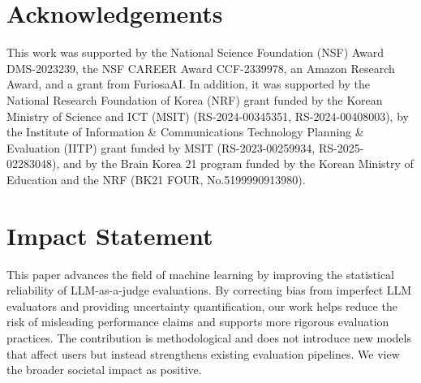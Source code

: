 \documentclass{article}
\theoremstyle{plain}
\theoremstyle{definition}
\theoremstyle{remark}
\begin{document}
\printAffiliationsAndNotice{}  %










\clearpage

\section*{Acknowledgements}

This work was supported by the National Science Foundation (NSF) Award DMS-2023239, the NSF CAREER Award CCF-2339978, an Amazon Research Award, and a grant from FuriosaAI.
In addition, it was supported by the National Research Foundation of Korea (NRF) grant funded by the Korean Ministry of Science and ICT (MSIT) (RS-2024-00345351, RS-2024-00408003), by the Institute of Information \& Communications Technology Planning \& Evaluation (IITP) grant funded by MSIT (RS-2023-00259934, RS-2025-02283048), and by the Brain Korea 21 program funded by the Korean Ministry of Education and the NRF (BK21 FOUR, No.5199990913980).

\section*{Impact Statement}

This paper advances the field of machine learning by improving the statistical reliability of LLM-as-a-judge evaluations. By correcting bias from imperfect LLM evaluators and providing uncertainty quantification, our work helps reduce the risk of misleading performance claims and supports more rigorous evaluation practices. The contribution is methodological and does not introduce new models that affect users but instead strengthens existing evaluation pipelines. We view the broader societal impact as positive.




\newpage
\appendix
\onecolumn




\end{document}
